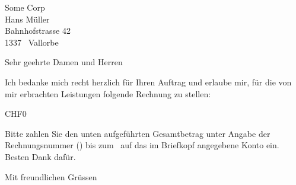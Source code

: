 \documentclass[DIN,SN,11pt,DIV=16,_rechnung]{scrlttr2}
\begin{document}
  \begin{letter}{
      Some Corp \\
      Hans Müller \\
      Bahnhofstrasse 42 \\
      1337 \ Vallorbe
    }

    \opening{Sehr geehrte Damen und Herren}

    Ich bedanke mich recht herzlich für Ihren Auftrag und erlaube mir, für die
    von mir erbrachten Leistungen folgende Rechnung zu stellen:

    \begin{invoice}{CHF}{0}
      
    \end{invoice}

    \begin{samepage}
      Bitte zahlen Sie den unten aufgeführten Gesamtbetrag unter Angabe
      der Rechnungsnummer (\invoiceReference) bis zum \payDate \ auf das
      im Briefkopf angegebene Konto ein.\\
      Besten Dank dafür.

      \closing{Mit freundlichen Grüssen}

      \invoiceEnclosures
    \end{samepage}
 \end{letter}
\end{document}

